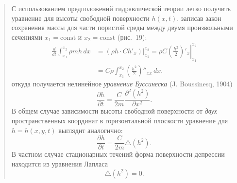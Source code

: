 \documentclass[12pt,a4paper]{article}
\begin{document}
\begin{quote}\sloppy
С использованием предположений гидравлической теории легко получить уравнение для высоты свободной поверхности $h(x,t)$, записав закон
сохранения массы для части пористой среды между двумя произвольными сечениями $x_1=\mathrm{const}$ и $x_2=\mathrm{const}$ (рис.~19):
\[\begin{aligned}
\frac{d}{dt}\int_{x_1}^{x_2}\rho mh\,dx&=\left.(\rho h\cdot Ch'_x)\right|_{x_1}^{x_2}=\left.\rho C\left(\frac{h^2}{2}\right)'_x\right|_{x_1}^{x_2}\\
&=C\rho\int_{x_1}^{x_2}\left(\frac{h^2}{2}\right)''_{xx}\,dx,
\end{aligned}\]
откуда получается нелинейное \textit{уравнение Буссинеска} (J. Boussinesq, 1904)
\begin{equation}\frac{\partial h}{\partial t}=\frac{C}{2m}\frac{\partial^2(h^2)}{\partial x^2}.\tag{9.3}\label{q6:eq-9-3}\end{equation}
В общем случае зависимости высоты свободной поверхности от \textit{двух} пространственных координат в горизонтальной плоскости уравнение для $h=h(x,y,t)$ выглядит аналогично:
\[\frac{\partial h}{\partial t}=\frac{C}{2m}\triangle(h^2).\]
В частном случае стационарных течений форма поверхности депрессии находится из уравнения Лапласа
\[\triangle(h^2)=0.\]
\par\nobreak{}\par
\end{quote}
\end{document}
